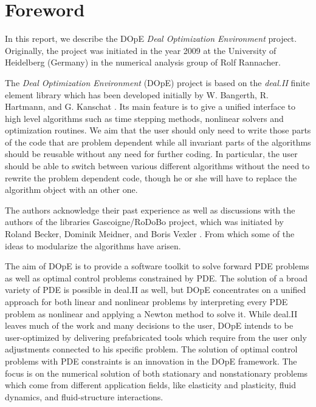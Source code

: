 \chapter{Foreword}
In this report, we describe the DOpE
\textit{Deal Optimization Environment} project. 
Originally, the project was initiated in the year 2009 at the 
University of Heidelberg (Germany) in the numerical analysis
group of Rolf Rannacher. 

The \textit{Deal Optimization Environment} (DOpE) project is 
based on the \textit{deal.II} finite element library which has been developed
 initially by W. Bangerth, R. Hartmann, and G. Kanschat \cite{deal}.
Its main feature is to give a unified interface to high level algorithms such as 
time stepping methods, nonlinear solvers and optimization routines. 
We aim that the user should only need to write those parts
of the code that are problem dependent while all invariant parts of the algorithms
should be reusable without any need for further coding.
In particular, the user should be able to switch between various different 
algorithms without the need to rewrite the problem dependent code, though he or she will
have to replace the algorithm object with an other one. 

The authors acknowledge their past experience as well as discussions with 
the authors of the libraries 
Gascoigne/RoDoBo project, which was initiated by 
Roland Becker, Dominik Meidner,  and Boris Vexler \cite{rodobo}. 
From which some of the ideas to modularize the algorithms have arisen.

The aim of DOpE is to provide a software toolkit to solve forward PDE
problems as well as optimal control problems constrained by PDE. The
solution of a broad variety of PDE is possible in deal.II as well, but
DOpE concentrates on a unified approach for both linear and nonlinear
problems by interpreting every PDE problem as nonlinear and applying a
Newton method to solve it. While deal.II leaves much of the work and many
decisions to the user, DOpE intends to be user-optimized by delivering
prefabricated tools which require from the user only adjustments connected
to his specific problem. The solution of optimal control problems with PDE
constraints is an innovation in the DOpE framework.
The focus is on the numerical solution of both stationary and nonstationary
problems which come from different application fields, like elasticity and
plasticity, fluid dynamics, and fluid-structure interactions.


